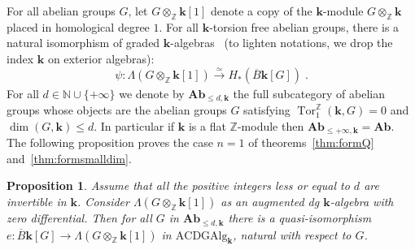 \documentclass{amsart}
\newtheorem{proposition}[formula]{Proposition}
\theoremstyle{definition}
\theoremstyle{remark}
\newcommand{\Z}{\mathbb Z}
\DeclareMathOperator{\Tor}{Tor}
\renewcommand{\le}{\leqslant}
\newcommand{\Ab}{\mathbf{Ab}}
\def\k{\mathbf{k}}
\begin{document}
For all abelian groups $G$, let $G\otimes_\Z\k[1]$ denote a copy of the $\k$-module $G\otimes_\Z\k$ placed in homological degree $1$. For all $\k$-torsion free abelian groups, there is a natural isomorphism of graded $\k$-algebras~\cite[V~Theorem~6.4~(ii)]{br-94}  (to lighten notations, we drop the index $\k$ on exterior algebras):
\[\psi:\Lambda(G\otimes_\Z\k[1])\xrightarrow[]{\simeq} H_*(\overline{B}\k [G])\;.\]
For all $d\in \mathbb{N}\cup\{+\infty\}$ we denote by 
$\Ab_{\le d,\k}$ the full subcategory of abelian groups whose objects are the abelian groups $G$ satisfying $\Tor_1^\Z(\k,G)=0$ and $\dim(G,\k)\le d$. In particular if $\k$ is a flat $\Z$-module then $\Ab_{\le +\infty,\k}=\Ab$. The following proposition proves the case $n=1$ of theorems~\ref{thm:formQ} and~\ref{thm:formsmalldim}.

\begin{proposition}
	\label{prop:level1formalityQ}
	Assume that all the positive integers less or equal to $d$ are invertible in $\k$. 
	Consider $\Lambda(G\otimes_\Z\k[1])$ as an augmented dg $\k$-algebra with zero differential. 
	Then for all $G$ in $\Ab_{\le d,\k}$ there is a quasi-isomorphism $e:\overline{B}\k[G]\to \Lambda(G\otimes_\Z\k[1])$ in $\mathrm{ACDGAlg}_\k$, natural with respect to $G$.
\end{proposition}
\end{document}
